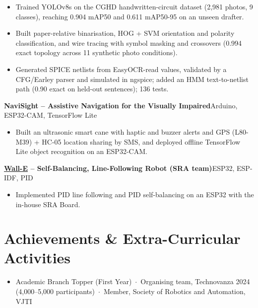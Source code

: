 \documentclass[10pt,letterpaper]{article}
\newcommand{\lnk}[2]{\href{#1}{\textcolor{linkblue}{#2}}}
\newcommand{\proj}[2]{\par\vspace{2pt}\textbf{#1}\hfill{\small #2}\par}
\begin{document}
\begin{itemize}
\item Trained YOLOv8s on the CGHD handwritten-circuit dataset (2,981 photos, 9 classes), reaching 0.904 mAP50 and 0.611 mAP50-95 on an unseen drafter.
\item Built paper-relative binarisation, HOG + SVM orientation and polarity classification, and wire tracing with symbol masking and crossovers (0.994 exact topology across 11 synthetic photo conditions).
\item Generated SPICE netlists from EasyOCR-read values, validated by a CFG/Earley parser and simulated in ngspice; added an HMM text-to-netlist path (0.90 exact on held-out sentences); 136 tests.
\end{itemize}
\proj{NaviSight -- Assistive Navigation for the Visually Impaired}{Arduino, ESP32-CAM, TensorFlow Lite}
\begin{itemize}
\item Built an ultrasonic smart cane with haptic and buzzer alerts and GPS (L80-M39) + HC-05 location sharing by SMS, and deployed offline TensorFlow Lite object recognition on an ESP32-CAM.
\end{itemize}
\proj{\lnk{https://github.com/SRA-VJTI/Wall-E}{Wall-E} -- Self-Balancing, Line-Following Robot (SRA team)}{ESP32, ESP-IDF, PID}
\begin{itemize}
\item Implemented PID line following and PID self-balancing on an ESP32 with the in-house SRA Board.
\end{itemize}


\section{Achievements \& Extra-Curricular Activities}
\begin{itemize}
\item Academic Branch Topper (First Year) \,$\cdot$\, Organising team, Technovanza 2024 (4,000--5,000 participants) \,$\cdot$\, Member, Society of Robotics and Automation, VJTI
\end{itemize}
\end{document}
